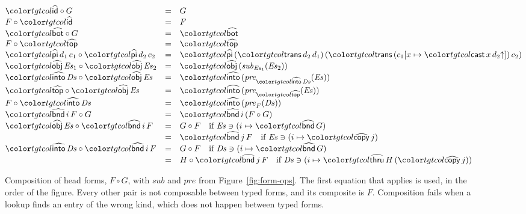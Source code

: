 \begin{figure}
\small
\color{tgtcol}
\[
\begin{array}{@{}lcl@{}}
\form{id} \circ G & = & G \\
F \circ \form{id} & = & F \\
\form{bot} \circ G & = & \form{bot} \\
F \circ \form{top} & = & \form{top} \\
\form{pi}\,d_1\,c_1 \circ \form{pi}\,d_2\,c_2 & = & \form{pi}\,(\ev{trans}\,d_2\,d_1)\,(\ev{trans}\,(c_1[x \mapsto \ev{cast}\,x\,\weak{d_2}])\,c_2) \\
\form{obj}\,\mathit{Es}_1 \circ \form{obj}\,\mathit{Es}_2 & = & \form{obj}\,(\mathit{sub}_{\mathit{Es}_1}(\mathit{Es}_2)) \\
\form{into}\,\mathit{Ds} \circ \form{obj}\,\mathit{Es} & = & \form{into}\,(\mathit{pre}_{\form{into}\,\mathit{Ds}}(\mathit{Es})) \\
\form{top} \circ \form{obj}\,\mathit{Es} & = & \form{into}\,(\mathit{pre}_{\form{top}}(\mathit{Es})) \\
F \circ \form{into}\,\mathit{Ds} & = & \form{into}\,(\mathit{pre}_F(\mathit{Ds})) \\
\form{bnd}\,i\,F \circ G & = & \form{bnd}\,i\,(F \circ G) \\
\form{obj}\,\mathit{Es} \circ \form{bnd}\,i\,F & = & G \circ F \quad \text{if } \mathit{Es} \ni (i \mapsto \form{bnd}\,G) \\
& = & \form{bnd}\,j\,F \quad \text{if } \mathit{Es} \ni (i \mapsto \form{copy}\,j) \\
\form{into}\,\mathit{Ds} \circ \form{bnd}\,i\,F & = & G \circ F \quad \text{if } \mathit{Ds} \ni (i \mapsto \form{bnd}\,G) \\
& = & H \circ \form{bnd}\,j\,F \quad \text{if } \mathit{Ds} \ni (i \mapsto \form{thru}\,H\,(\form{copy}\,j))
\end{array}
\]
\color{black}
\caption{Composition of head forms, $F \circ G$, with $\mathit{sub}$ and $\mathit{pre}$ from Figure~\ref{fig:form-ops}. The first equation that applies is used, in the order of the figure. Every other pair is not composable between typed forms, and its composite is $F$. Composition fails when a lookup finds an entry of the wrong kind, which does not happen between typed forms.}
\label{fig:combine}
\end{figure}

